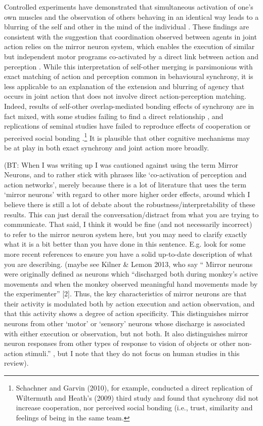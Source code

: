 Controlled experiments have demonstrated that simultaneous activation of one's own muscles and the observation of others behaving in an identical way leads to a blurring of the self and other in the mind of the individual \citep{Hurley2008,Rizzolatti2004}. These findings are consistent with the suggestion that coordination observed between agents in joint action relies on the  mirror neuron system, which enables the execution of similar but independent motor programs co-activated by a direct link between action and perception \citep{Rizzolatti2004}.  While this interpretation of self-other merging is parsimonious with exact matching of action and perception common in behavioural synchrony, it is less applicable to an explanation of the extension and blurring of agency that occurs in joint action that does not involve direct action-perception matching. Indeed, results of self-other overlap-mediated bonding effects of synchrony are in fact mixed, with some studies failing to find a direct relationship \citep{Cohen2013a,Reddish2013a}, and replications of seminal studies have failed to reproduce effects of cooperation or perceived social bonding \citep{Dam2012,Schachner2010}.\footnote{Schachner and Garvin (2010), for example, conducted a direct replication of Wiltermuth and Heath's (2009) third study and found that synchrony did not increase cooperation, nor perceived social bonding (i.e., trust, similarity and feelings of being in the same team.} It is plausible that other cognitive mechanisms may be at play in both exact synchrony and joint action more broadly.

(BT: When I was writing up I was cautioned against using the term Mirror Neurons, and to rather stick with phrases like ‘co-activation of perception and action networks’, merely because there is a lot of literature that uses the term ‘mirror neurons’ with regard to other more higher order effects, around which I believe there is still a lot of debate about the robustness/interpretability of these results. This can just derail the conversation/distract from what you are trying to communicate. That said, I think it would be fine (and not necessarily incorrect) to refer to the mirror neuron system here, but you may need to clarify exactly what it is a bit better than you have done in this sentence. E.g. look for some more recent references to ensure you have a solid up-to-date description of what you are describing. (maybe see Kilner & Lemon 2013, who say “ Mirror neurons were originally defined as neurons which “discharged both during monkey’s active movements and when the monkey observed meaningful hand movements made by the experimenter” [2]. Thus, the key characteristics of mirror neurons are that their activity is modulated both by action execution and action observation, and that this activity shows a degree of action specificity. This distinguishes mirror neurons from other ‘motor’ or ‘sensory’ neurons whose discharge is associated with either execution or observation, but not both. It also distinguishes mirror neuron responses from other types of response to vision of objects or other non-action stimuli.” , but I note that they do not focus on human studies in this review).

